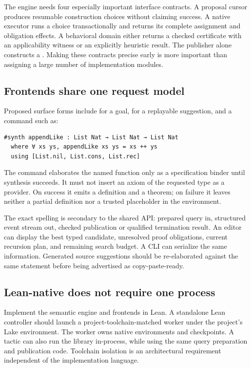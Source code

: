 The engine needs four especially important interface contracts. A proposal cursor produces resumable construction choices without claiming success. A native executor runs a choice transactionally and returns its complete assignment and obligation effects. A behavioral domain either returns a checked certificate with an applicability witness or an explicitly heuristic result. The publisher alone constructs a . Making these contracts precise early is more important than assigning a large number of implementation modules.

\subsection{Frontends share one request model}
Proposed surface forms include  for a goal,  for a replayable suggestion, and a command such as:
\begin{lstlisting}[caption={Proposed command syntax, not implemented by the attached prototype.}]
#synth appendLike : List Nat → List Nat → List Nat
  where ∀ xs ys, appendLike xs ys = xs ++ ys
  using [List.nil, List.cons, List.rec]
\end{lstlisting}
The command elaborates the named function only as a specification binder until synthesis succeeds. It must not insert an axiom of the requested type as a provider. On success it emits a definition and a theorem; on failure it leaves neither a partial definition nor a trusted placeholder in the environment.

The exact spelling is secondary to the shared API: prepared query in, structured event stream out, checked publication or qualified termination result. An editor can display the best typed candidate, unresolved proof obligations, current recursion plan, and remaining search budget. A CLI can serialize the same information. Generated source suggestions should be re-elaborated against the same statement before being advertised as copy-paste-ready.

\subsection{Lean-native does not require one process}
Implement the semantic engine and frontends in Lean. A standalone Lean controller should launch a project-toolchain-matched worker under the project's Lake environment. The worker owns native environments and checkpoints. A tactic can also run the library in-process, while using the same query preparation and publication code. Toolchain isolation is an architectural requirement independent of the implementation language.\cite{rewrite}

